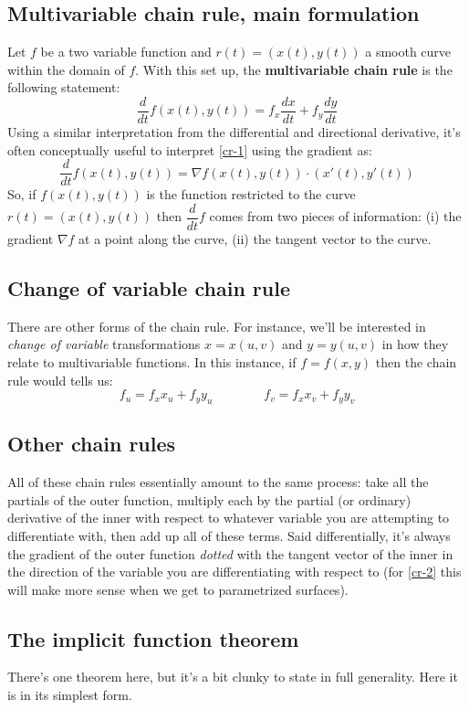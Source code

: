 \documentclass[12pt]{article}
\numberwithin{equation}{subsection}
\numberwithin{figure}{subsection}
\theoremstyle{note}
\begin{document}
{\subsection{Multivariable chain rule, main formulation} Let $f$ be a two variable function and $r(t)=(x(t),y(t))$ a smooth curve within the domain of $f$. With this set up, the \textbf{multivariable chain rule} is the following statement: 
\begin{equation} \dfrac{d}{dt} f(x(t),y(t))=f_x \dfrac{dx}{dt} + f_y \dfrac{dy}{dt} \label{cr-1}\end{equation}
Using a similar interpretation from the differential and directional derivative, it's often conceptually useful to interpret \eqref{cr-1} using the gradient as: \[ \dfrac{d}{dt} f(x(t),y(t)) = \nabla f(x(t),y(t)) \cdot (x'(t), y'(t)) \] So, if $f(x(t),y(t))$ is the function restricted to the curve $r(t)=(x(t),y(t))$ then $\dfrac{d}{dt} f$ comes from two pieces of information: (i) the gradient $\nabla f$ at a point along the curve, (ii) the tangent vector to the curve.


\subsection{Change of variable chain rule} There are other forms of the chain rule. For instance, we'll be interested in \textit{change of variable} transformations $x=x(u,v)$ and $y=y(u,v)$ in how they relate to multivariable functions. In this instance, if $f=f(x,y)$ then the chain rule would tells us:
\begin{equation} \label{cr-2} f_u = f_x x_u+f_y y_u \qquad \qquad f_v = f_x x_v+f_y y_v\end{equation} 


\subsection{Other chain rules} All of these chain rules essentially amount to the same process: take all the partials of the outer function, multiply each by the partial (or ordinary) derivative of the inner with respect to whatever variable you are attempting to differentiate with, then add up all of these terms. Said differentially, it's always the gradient of the outer function \textit{dotted} with the tangent vector of the inner in the direction of the variable you are differentiating with respect to (for \eqref{cr-2} this will make more sense when we get to parametrized surfaces).

\subsection{The implicit function theorem}
There's one theorem here, but it's a bit clunky to state in full generality. Here it is in its simplest form.

}
\end{document}
